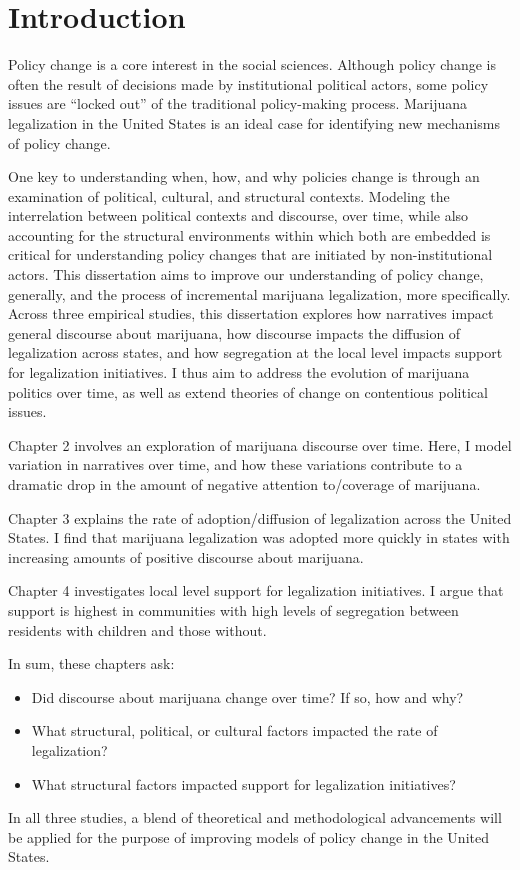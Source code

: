 \chapter{Introduction}

Policy change is a core interest in the social sciences. Although policy change is often the result of decisions made by institutional political actors, some policy issues are ``locked out'' of the traditional policy-making process. Marijuana legalization in the United States is an ideal case for identifying new mechanisms of policy change. 

One key to understanding when, how, and why policies change is through an examination of political, cultural, and structural contexts. Modeling the interrelation between political contexts and discourse, over time, while also accounting for the structural environments within which both are embedded is critical for understanding policy changes that are initiated by non-institutional actors. This dissertation aims to improve our understanding of policy change, generally, and the process of incremental marijuana legalization, more specifically. Across three empirical studies, this dissertation explores how narratives impact general discourse about marijuana, how discourse impacts the diffusion of legalization across states, and how segregation at the local level impacts support for legalization initiatives. I thus aim to address the evolution of marijuana politics over time, as well as extend theories of change on contentious political issues. 


Chapter 2 involves an exploration of marijuana discourse over time. Here, I model variation in narratives over time, and how these variations contribute to a dramatic drop in the amount of negative attention to/coverage of marijuana. 

Chapter 3 explains the rate of adoption/diffusion of legalization across the United States. I find that marijuana legalization was adopted more quickly in states with increasing amounts of positive discourse about marijuana. 

Chapter 4 investigates local level support for legalization initiatives. I argue that support is highest in communities with high levels of segregation between residents with children and those without. 


In sum, these chapters ask:

\begin{itemize}
\item Did discourse about marijuana change over time? If so, how and why?
\item What structural, political, or cultural factors impacted the rate of legalization?
\item What structural factors impacted support for legalization initiatives?
\end{itemize}

In all three studies, a blend of theoretical and methodological advancements will be applied for the purpose of improving models of policy change in the United States.
